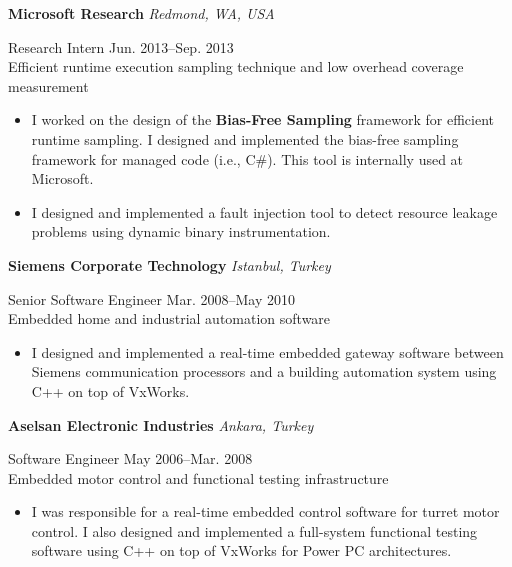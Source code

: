 \documentclass[10pt]{article}
\newcommand{\mysub}[3]{\textbf{#1} {#2} \hfill {\em #3}}
\newcommand{\myssub}[1]{\hspace*{2mm}\parbox{163mm}{#1}\vspace*{2mm}}
\begin{document}
\mysub{Microsoft Research}{}{Redmond, WA, USA} \\
\myssub{\vspace{1mm}Research Intern \hfill Jun. 2013--Sep. 2013\\
Efficient runtime execution sampling technique and low overhead coverage measurement
\vspace{-1mm}
\begin{itemize}
\setlength\itemsep{0em}
\item{I worked on the design of the \textbf{Bias-Free Sampling} framework for efficient runtime sampling. I designed and implemented the bias-free sampling framework for managed code (i.e., C\#). This tool is internally used at Microsoft.}
\item{I designed and implemented a fault injection tool to detect resource leakage problems using dynamic binary instrumentation. }
\end{itemize}
\vspace{-2mm}
}

\newpage

\mysub{Siemens Corporate Technology}{}{Istanbul, Turkey} \\
\myssub{\vspace{1mm}Senior Software Engineer \hfill Mar. 2008--May 2010 \\
Embedded home and industrial automation software
\vspace{-1mm}
\begin{itemize}
\setlength\itemsep{0em}
\item{I designed and implemented a real-time embedded gateway software between Siemens communication processors and a building automation system using C++ on top of VxWorks.}
\end{itemize}
}


\mysub{Aselsan Electronic Industries}{}{Ankara, Turkey} \\
\myssub{\vspace{1mm}Software Engineer \hfill May 2006--Mar. 2008 \\
Embedded motor control and functional testing infrastructure
\vspace{-1mm}
\begin{itemize}
\setlength\itemsep{0em}
\item{I was responsible for a real-time embedded control software for turret motor control. I also designed and implemented a full-system functional testing software using C++ on top of VxWorks for Power PC architectures.}
\end{itemize}
}
\end{document}
